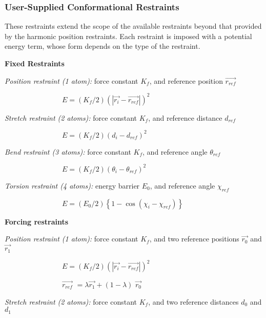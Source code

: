 
\subsubsection{User-Supplied Conformational Restraints}

These restraints extend the scope of the available restraints beyond that
provided by the harmonic position restraints. Each restraint is imposed with
a potential energy term, whose form depends on the type of the
restraint.\medskip

{\bf Fixed Restraints}

{\em Position restraint (1 atom):} force constant $K_{f}$, and reference
position $\overrightarrow{r_{ref}}$

$\qquad \qquad \qquad \qquad E=\left( K_{f}/2\right) \left( \left| 
\overrightarrow{r_{i}}-\overrightarrow{r_{ref}}\right| \right) ^{2}$

{\em Stretch restraint (2 atoms):} force constant $K_{f}$, and reference
distance $d_{ref}$

$\qquad \qquad \qquad \qquad E=\left( K_{f}/2\right) \left(
d_{i}-d_{ref}\right) ^{2}$

{\em Bend restraint (3 atoms):} force constant $K_{f}$, and reference angle $
\theta _{ref}$

$\qquad \qquad \qquad \qquad E=\left( K_{f}/2\right) \left( \theta
_{i}-\theta _{ref}\right) ^{2}$

{\em Torsion restraint (4 atoms):} energy barrier $E_{0}$, and reference
angle $\chi _{ref}$

$\qquad \qquad \qquad \qquad E=\left( E_{0}/2\right) \left\{ 1-\cos \left(
\chi _{i}-\chi _{ref}\right) \right\} $

{\bf Forcing restraints}

{\em Position restraint (1 atom):} force constant $K_{f}$, and two reference
positions $\overrightarrow{r_{0}}$ and $\overrightarrow{r_{1}}$

$\qquad \qquad \qquad \qquad E=\left( K_{f}/2\right) \left( \left| 
\overrightarrow{r_{i}}-\overrightarrow{r_{ref}}\right| \right) ^{2}$

$\qquad \qquad \qquad \qquad \overrightarrow{r_{ref}}$ $=\lambda 
\overrightarrow{r_{1}}+\left( 1-\lambda \right) $ $\overrightarrow{r_{0}}$

{\em Stretch restraint (2 atoms):} force constant $K_{f}$, and two reference
distances $d_{0}$ and $d_{1}$

